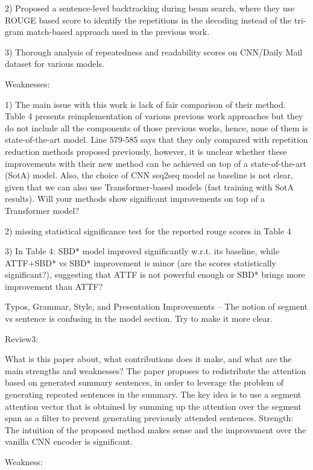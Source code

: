 2) Proposed a sentence-level backtracking during beam search, where they use ROUGE based score to identify the repetitions in the decoding instead of the tri-gram match-based approach used in the previous work.

3) Thorough analysis of repeatedness and readability scores on CNN/Daily Mail dataset for various models.

Weaknesses:

1) The main issue with this work is lack of fair comparison of their method. Table 4 presents reimplementation of various previous work approaches but they do not include all the components of those previous works, hence, none of them is state-of-the-art model. Line 579-585 says that they only compared with repetition reduction methods proposed previously, however, it is unclear whether these improvements with their new method can be achieved on top of a state-of-the-art (SotA) model. Also, the choice of CNN seq2seq model as baseline is not clear, given that we can also use Transformer-based models (fast training with SotA results). Will your methods show significant improvements on top of a Transformer model?

2) missing statistical significance test for the reported rouge scores in Table 4

3) In Table 4: SBD* model improved significantly w.r.t. its baseline, while ATTF+SBD* vs SBD* improvement is minor (are the scores statistically significant?), suggesting that ATTF is not powerful enough or SBD* brings more improvement than ATTF?

Typos, Grammar, Style, and Presentation Improvements
-- The notion of segment vs sentence is confusing in the model section. Try to make it more clear.

Review3:

What is this paper about, what contributions does it make, and what are the main strengths and weaknesses?
The paper proposes to redistribute the attention based on generated summary sentences, in order to leverage the problem of generating repeated sentences in the summary. The key idea is to use a segment attention vector that is obtained by summing up the attention over the segment span as a filter to prevent generating previously attended sentences.
Strength: The intuition of the proposed method makes sense and the improvement over the vanilla CNN encoder is significant.

Weakness:

